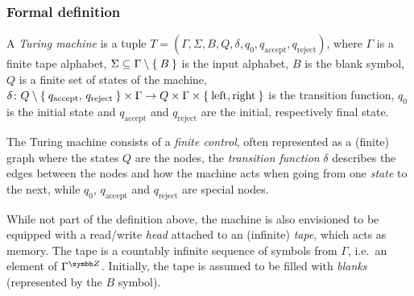 \subsubsection{Formal definition}

\begin{definition}
A \emph{Turing machine} is a tuple \(T = \left(\Gamma, \Sigma, B, Q, \delta, q_0, q_{\text{accept}}, q_{\text{reject}}\right)\), where \(\Gamma\) is a finite tape alphabet, \(\Sigma \subseteq \Gamma \setminus \Set{ B }\) is the input alphabet, \(B\) is the blank symbol, \(Q\) is a finite set of states of the machine, \(\delta \colon Q \setminus \Set{ q_{\text{accept}}, \, q_{\text{reject}} } \times \Gamma \to Q \times \Gamma \times \Set{ \text{left}, \text{right} }\) is the transition function, \(q_0\) is the initial state and \(q_{\text{accept}}\) and \(q_{\text{reject}}\) are the initial, respectively final state.
\end{definition}

The Turing machine consists of a \emph{finite control}, often represented as a (finite) graph where the states \(Q\) are the nodes, the \emph{transition function} \(\delta\) describes the edges between the nodes and how the machine acts when going from one \emph{state} to the next, while \(q_0\), \(q_{\text{accept}}\) and \(q_{\text{reject}}\) are special nodes.

While not part of the definition above, the machine is also envisioned to be equipped with a read/write \emph{head} attached to an (infinite) \emph{tape}, which acts as memory. The tape is a countably infinite sequence of symbols from \(\Gamma\), i.e.\ an element of \(\Gamma^{\integers}\). Initially, the tape is assumed to be filled with \emph{blanks} (represented by the \(B\) symbol).

